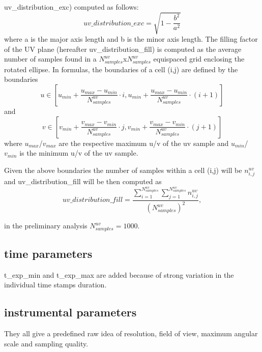 \documentclass[11pt,a4paper]{ivoa}
\begin{document}
uv\_distribution\_exc) computed as follows:
\begin{equation}
uv\_distribution\_exc = \sqrt{1-\frac{b^2}{a^2}}
\end{equation}
where a is the major axis length and b is the minor axis length.
The filling factor of the UV plane (hereafter uv\_distribution\_fill) is computed as the average number of samples found in a $N^{uv}_{samples}$x$N^{uv}_{samples}$ equispaced grid enclosing the rotated ellipse. In formulas,
 the boundaries of a cell (i,j) are defined by the boundaries
\begin{equation}
u \in [u_{min} + \frac{u_{max} - u_{min}}{N^{uv}_{samples}} \cdot i , u_{min} + \frac{u_{max} - u_{min}}{N^{uv}_{samples}} \cdot (i + 1)]
\end{equation} 
and
\begin{equation}
v \in [v_{min} + \frac{v_{max} - v_{min}}{N^{uv}_{samples}} \cdot j , v_{min} + \frac{v_{max} - v_{min}}{N^{uv}_{samples}} \cdot (j + 1)]
\end{equation} 
where $u_{max}$/$v_{max}$ are the respective maximum u/v of the uv sample and $u_{min}$/$v_{min}$ is the minimum u/v of the uv sample.

Given the above boundaries the number of samples within a cell (i,j) will be $n^{uv}_{i,j}$ and uv\_distribution\_fill will be then computed as 
\begin{equation}
uv\_distribution\_fill = \frac{\sum^{N^{uv}_{samples}}_{i=1} \sum^{N^{uv}_{samples}}_{j=1} n^{uv}_{i,j} }{(N^{uv}_{samples}) ^ 2},
\end{equation}

in the preliminary analysis $N^{uv}_{samples} = 1000$.



\subsection{time parameters}

t\_exp\_min and t\_exp\_max are added because of strong variation in the individual time stamps duration.
\subsection{instrumental parameters}

They all give a predefined raw idea of resolution, field of view, maximum angular scale and sampling quality.
\end{document}
